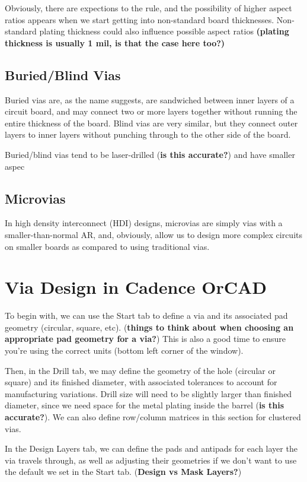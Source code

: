 \documentclass{article}
\begin{document}
Obviously, there are expections to the rule, and the possibility of higher aspect ratios appears when we start getting into non-standard board thicknesses. Non-standard plating thickness could also influence possible aspect ratios \textbf{(plating thickness is usually 1 mil, is that the case here too?)}

\subsection{Buried/Blind Vias}
Buried vias are, as the name suggests, are sandwiched between inner layers of a circuit board, and may connect two or more layers together without running the entire thickness of the board. Blind vias are very similar, but they connect outer layers to inner layers without punching through to the other side of the board.

Buried/blind vias tend to be laser-drilled (\textbf{is this accurate?}) and have smaller aspec 
\subsection{Microvias}
In high density interconnect (HDI) designs, microvias are simply vias with a smaller-than-normal AR, and, obviously, allow us to design more complex circuits on smaller boards as compared to using traditional vias. 

\section{Via Design in Cadence OrCAD}

To begin with, we can use the Start tab to define a via and its associated pad geometry (circular, square, etc). (\textbf{things to think about when choosing an appropriate pad geometry for a via?}) This is also a good time to ensure you're using the correct units (bottom left corner of the window).

Then, in the Drill tab, we may define the geometry of the hole (circular or square) and its finished diameter, with associated tolerances to account for manufacturing variations. Drill size will need to be slightly larger than finished diameter, since we need space for the metal plating inside the barrel (\textbf{is this accurate?}). We can also define row/column matrices in this section for clustered vias. 

In the Design Layers tab, we can define the pads and antipads for each layer the via travels through, as well as adjusting their geometries if we don't want to use the default we set in the Start tab. (\textbf{Design vs Mask Layers?})
\end{document}
